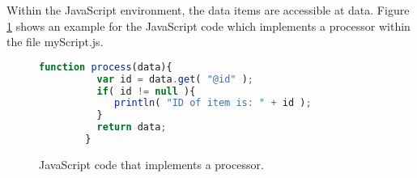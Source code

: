Within the JavaScript environment, the data items are accessible at
{\ttfamily data}. Figure \ref{fig:javascriptProcessor} shows an
example for the JavaScript code which implements a processor within
the file {\ttfamily myScript.js}.

\begin{figure}[h!]
  \centering
  \begin{lstlisting}[language=JavaScript,showspaces=false,showstringspaces=false]
       function process(data){
          var id = data.get( "@id" );
          if( id != null ){
             println( "ID of item is: " + id );
          }
          return data;
        }
  \end{lstlisting}
  \caption{\label{fig:javascriptProcessor}JavaScript code that implements a processor.}
\end{figure}